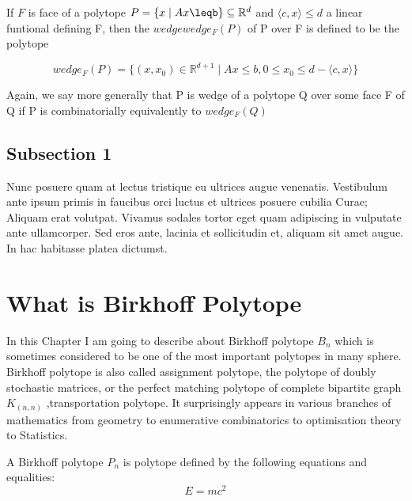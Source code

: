 If $F$ is face of a polytope $P = \{ x \mid Ax \leqb \} \subseteq \mathbb{R}^d$ and $ \langle c,x \rangle \leq d $ a linear funtional defining F, then the $wedge wedge_F(P)$ of P over F is defined to be the polytope
 
 \begin{equation}
wedge_F(P) = \{ (x,x_0) \in \mathbb{R}^{d+1} \mid Ax\leq b, 0\leq x_0 \leq d- \langle c,x \rangle\}
\label{eqn:Einstein}
\end{equation}

Again, we say more generally that P is wedge of a polytope  Q over some face F of Q if P is combinatorially equivalently to $wedge_F(Q)$

\subsection{Subsection 1}

Nunc posuere quam at lectus tristique eu ultrices augue venenatis. Vestibulum ante ipsum primis in faucibus orci luctus et ultrices posuere cubilia Curae; Aliquam erat volutpat. Vivamus sodales tortor eget quam adipiscing in vulputate ante ullamcorper. Sed eros ante, lacinia et sollicitudin et, aliquam sit amet augue. In hac habitasse platea dictumst.




\section{What is Birkhoff Polytope}

In this Chapter I am going to describe about Birkhoff polytope $B_n$ which is sometimes considered to be one of the most important polytopes in many sphere. Birkhoff polytope is also called assignment polytope, the polytope of doubly stochastic matrices, or the perfect matching polytope of complete bipartite graph $K_(n,n)$ ,transportation polytope. It surprisingly appears in various branches of mathematics from geometry to enumerative combinatorics to optimisation theory to Statistics.

A Birkhoff polytope $P_n$ is polytope defined by the following equations and equalities:
\begin{equation}
E = mc^{2}
\label{eqn:Einstein}
\end{equation}	


